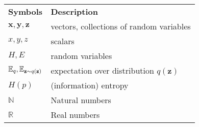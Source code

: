 \noindent
{}
\begin{tabularx}{\linewidth}
{ l >{\raggedright\arraybackslash}X }
\bfseries Symbols & \bfseries Description \\\Midrule
$\mathbf{x},\mathbf{y},\mathbf{z}$ & vectors, collections of random variables \\
$x,y,z$  & scalars \\
$H,E$    & random variables \\
$ \operatorname{\mathbb{E}}_q, \operatorname{\mathbb{E}}_{\mathbf{z}\sim q(\mathbf{z})}$ & expectation over distribution $q(\mathbf{z})$ \\
$H(p)$ & (information) entropy \\
$\mathbb{N}$ & Natural numbers \\
$\mathbb{R}$ & Real numbers \\
\end{tabularx}

